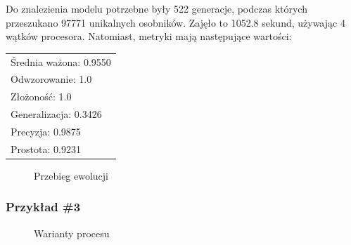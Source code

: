 Do znalezienia modelu potrzebne były 522 generacje, podczas których przeszukano 97771 unikalnych osobników. Zajęło to 1052.8 sekund, używając 4 wątków procesora. Natomiast, metryki mają następujące wartości: 

 \begin{center}
  \begin{tabular}{l}
	Średnia ważona: 0.9550 \\
	Odwzorowanie: 1.0 \\
	Złożoność: 1.0 \\
	Generalizacja: 0.3426 \\
	Precyzja: 0.9875 \\
	Prostota: 0.9231
  \end{tabular}
 \end{center}
 
\begin{figure}[!ht]
	\caption{\label{fig:flow_chart}Przebieg ewolucji}
\end{figure}

\subsubsection{Przykład \#3}
\begin{figure}[!ht]
	\caption{\label{fig:flow_chart}Warianty procesu}
\end{figure}

